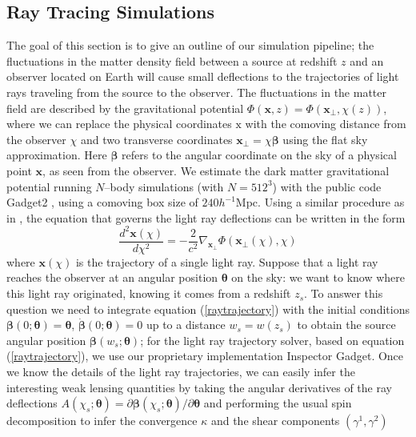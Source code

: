 \documentclass[reprint,aps,prd,superscriptaddress,showkeys,showpacs]{revtex4-1}
\begin{document}
\subsection{Ray Tracing Simulations}
\label{raysim}
The goal of this section is to give an outline of our simulation pipeline; the fluctuations in the matter density field between a source at redshift $z$ and an observer located on Earth will cause small deflections to the trajectories of light rays traveling from the source to the observer. The fluctuations in the matter field are described by the gravitational potential $\Phi(\mathbf{x},z)=\Phi(\mathbf{x}_\perp,\chi(z))$, where we can replace the physical coordinates $\mathrm{x}$ with the comoving distance from the observer $\chi$ and two transverse coordinates $\mathbf{x}_\perp=\chi\pmb{\beta}$ using the flat sky approximation. Here $\pmb{\beta}$ refers to the angular coordinate on the sky of a physical point $\mathbf{x}$, as seen from the observer. We estimate the dark matter gravitational potential running $N$--body simulations (with $N=512^3$) with the public code Gadget2 \citep{Gadget2}, using a comoving box size of $240h^{-1}$Mpc. Using a similar procedure as in \citep{RayTracingJain,RayTracingHartlap}, the equation that governs the light ray deflections can be written in the form
\begin{equation}
\label{raytrajectory}
\frac{d^2\mathbf{x}(\chi)}{d\chi^2} = -\frac{2}{c^2}\nabla_{\mathbf{x}_\perp}\Phi(\mathbf{x}_\perp(\chi),\chi)
\end{equation}
%
where $\mathbf{x}(\chi)$ is the trajectory of a single light ray. Suppose that a light ray reaches the observer at an angular position $\pmb{\theta}$ on the sky: we want to know where this light ray originated, knowing it comes from a redshift $z_s$. To answer this question we need to integrate equation (\ref{raytrajectory}) with the initial conditions $\pmb{\beta}(0;\pmb{\theta})=\pmb{\theta}$, $\dot{\pmb{\beta}}(0;\pmb{\theta})=0$ up to a distance $w_s=w(z_s)$ to obtain the source angular position $\pmb{\beta}(w_s;\pmb{\theta})$; for the light ray trajectory solver, based on equation (\ref{raytrajectory}), we use our proprietary implementation Inspector Gadget. Once we know the details of the light ray trajectories, we can easily infer the interesting weak lensing  quantities by taking the angular derivatives of the ray deflections $A(\chi_s;\pmb{\theta}) = \partial \pmb{\beta}(\chi_s;\pmb{\theta})/\partial\pmb{\theta}$ and performing the usual spin decomposition to infer the convergence $\kappa$ and the shear components $(\gamma^1,\gamma^2)$
\end{document}
